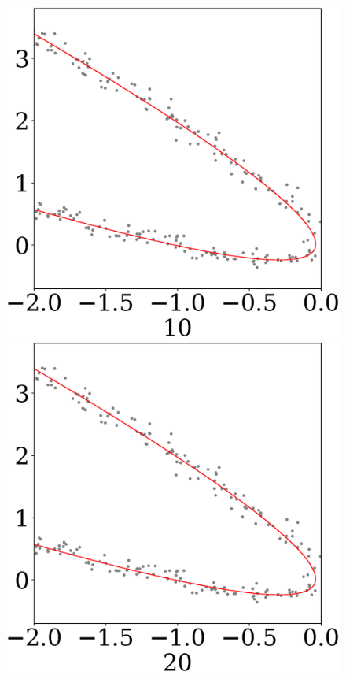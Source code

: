 \documentclass[12pt,twoside]{article}
\begin{document}
\begin{figure}
\begin{minipage}{.25\textwidth}
      \includegraphics[scale = 0.19]{511_10.eps}
\end{minipage}
\begin{minipage}{.25\textwidth}

      \includegraphics[scale = 0.19]{511_20.eps}
\end{minipage}
\begin{minipage}{.20\textwidth}


\end{minipage}
\end{figure}
\end{document}
